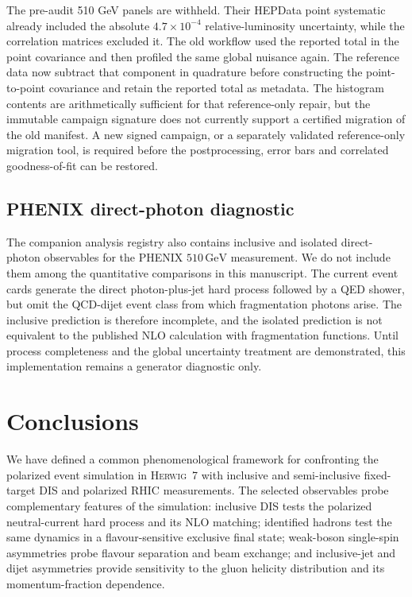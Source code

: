 \documentclass[11pt,a4paper]{article}
\newcommand{\Herwig}{\textsc{Herwig}}
\newcommand{\GeV}{\ensuremath{\,\mathrm{GeV}}}
\begin{document}
The pre-audit 510 GeV panels are withheld.  Their HEPData point systematic
already included the absolute $4.7\times10^{-4}$ relative-luminosity
uncertainty, while the correlation matrices excluded it.  The old workflow
used the reported total in the point covariance and then profiled the same
global nuisance again.  The reference data now subtract that component in
quadrature before constructing the point-to-point covariance and retain the
reported total as metadata.  The histogram contents are arithmetically
sufficient for that reference-only repair, but the immutable campaign
signature does not currently support a certified migration of the old
manifest.  A new signed campaign, or a separately validated reference-only
migration tool, is required before the postprocessing, error bars and
correlated goodness-of-fit can be restored.

\subsection{PHENIX direct-photon diagnostic}

The companion analysis registry also contains inclusive and isolated
direct-photon observables for the PHENIX $510\GeV$ measurement.  We do not
include them among the quantitative comparisons in this manuscript.  The
current event cards generate the direct photon-plus-jet hard process followed
by a QED shower, but omit the QCD-dijet event class from which fragmentation
photons arise.  The inclusive prediction is therefore incomplete, and the
isolated prediction is not equivalent to the published NLO calculation with
fragmentation functions.  Until process completeness and the global
uncertainty treatment are demonstrated, this implementation remains a
generator diagnostic only.

\FloatBarrier
\section{Conclusions}
\label{sec:conclusions}

We have defined a common phenomenological framework for confronting the
polarized event simulation in \Herwig~7 with inclusive and semi-inclusive
fixed-target DIS and polarized RHIC measurements.  The selected observables
probe complementary features of the simulation: inclusive DIS tests the
polarized neutral-current hard process and its NLO matching; identified
hadrons test the same dynamics in a flavour-sensitive exclusive final state;
weak-boson single-spin asymmetries probe flavour separation and beam exchange;
and inclusive-jet and dijet asymmetries provide sensitivity to the gluon
helicity distribution and its momentum-fraction dependence.
\end{document}
